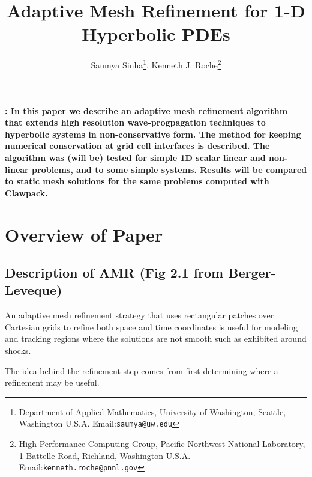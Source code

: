 \documentclass[12pt,leqno]{article}
\begin{document}
\title{\bf Adaptive Mesh Refinement for 1-D Hyperbolic PDEs}
\author{ 
Saumya Sinha\footnote{Department of Applied Mathematics, University of Washington, Seattle, Washington
U.S.A.
Email:\texttt{saumya@uw.edu}},
Kenneth J. Roche\footnote{
High Performance Computing Group, 
Pacific Northwest National Laboratory,
1 Battelle Road,
Richland, Washington 
U.S.A. 
Email:\texttt{kenneth.roche@pnnl.gov}} 
}
\maketitle


{\bf \abstractname{: In this paper we describe an adaptive mesh refinement algorithm that extends high resolution wave-progpagation techniques to hyperbolic systems in non-conservative form. The method for keeping numerical conservation at grid cell interfaces is described. The algorithm was (will be) tested for simple 1D scalar linear and non-linear problems, and to some simple systems. Results will be compared to static mesh solutions for the same problems computed with Clawpack\cite{claw}.}} {\small}

\newpage
\tableofcontents
\listoffigures
\listoftables
\newpage

\section{Overview of Paper}
\subsection{Description of AMR (Fig 2.1 from Berger-Leveque)}
An adaptive mesh refinement strategy that uses rectangular patches over Cartesian grids to refine both space and time coordinates is useful for modeling and tracking regions where the solutions are not smooth such as exhibited around shocks. 

The idea behind the refinement step comes from first determining where a refinement may be useful. 
\end{document}
